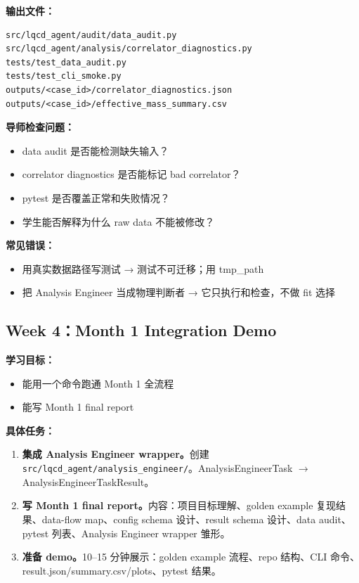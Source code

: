 \documentclass[11pt,a4paper,fontset=fandol]{ctexart}
\begin{document}
\textbf{输出文件：}
\begin{lstlisting}
src/lqcd_agent/audit/data_audit.py
src/lqcd_agent/analysis/correlator_diagnostics.py
tests/test_data_audit.py
tests/test_cli_smoke.py
outputs/<case_id>/correlator_diagnostics.json
outputs/<case_id>/effective_mass_summary.csv
\end{lstlisting}

\textbf{导师检查问题：}
\begin{itemize}
  \item data audit 是否能检测缺失输入？
  \item correlator diagnostics 是否能标记 bad correlator？
  \item pytest 是否覆盖正常和失败情况？
  \item 学生能否解释为什么 raw data 不能被修改？
\end{itemize}

\textbf{常见错误：}
\begin{itemize}
  \item 用真实数据路径写测试 → 测试不可迁移；用 tmp\_path
  \item 把 Analysis Engineer 当成物理判断者 → 它只执行和检查，不做 fit 选择
\end{itemize}

\subsection{Week 4：Month 1 Integration Demo}

\textbf{学习目标：}
\begin{itemize}
  \item 能用一个命令跑通 Month 1 全流程
  \item 能写 Month 1 final report
\end{itemize}

\textbf{具体任务：}
\begin{enumerate}
  \item \textbf{集成 Analysis Engineer wrapper。}创建 \texttt{src/lqcd\_agent/analysis\_engineer/}。AnalysisEngineerTask $\to$ AnalysisEngineerTaskResult。
  \item \textbf{写 Month 1 final report。}内容：项目目标理解、golden example 复现结果、data-flow map、config schema 设计、result schema 设计、data audit、pytest 列表、Analysis Engineer wrapper 雏形。
  \item \textbf{准备 demo。}10--15 分钟展示：golden example 流程、repo 结构、CLI 命令、result.json/summary.csv/plots、pytest 结果。
\end{enumerate}
\end{document}
